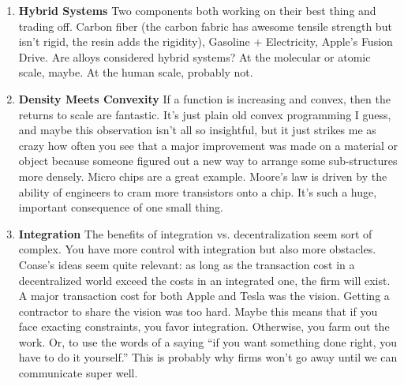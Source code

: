 \documentclass[paper=a4, fontsize=11pt]{scrartcl} %
\numberwithin{equation}{section} %
\numberwithin{figure}{section} %
\numberwithin{table}{section} %
\begin{document}
\begin{enumerate} 
\item \textbf{Hybrid Systems} Two components both working on their best thing and trading off.  Carbon fiber (the carbon fabric has awesome tensile strength but isn't rigid, the resin adds the rigidity),  Gasoline + Electricity, Apple's Fusion Drive.  Are alloys considered hybrid systems?  At the molecular or atomic scale, maybe.  At the human scale, probably not.  
\item \textbf{Density Meets Convexity} If a function is increasing and convex, then the returns to scale are fantastic.  It's just plain old convex programming I guess, and maybe this observation isn't all so insightful, but it just strikes me as crazy how often you see that a major improvement was made on a material or object because someone figured out a new way to arrange some sub-structures more densely.  Micro chips are a great example.  Moore's law is driven by the ability of engineers to cram more transistors onto a chip.  It's such a huge, important consequence of one small thing.
\item \textbf{Integration} The benefits of integration vs. decentralization seem sort of complex.  You have more control with integration but also more obstacles.  Coase's ideas seem quite relevant: as long as the transaction cost in a decentralized world exceed the costs in an integrated one, the firm will exist.  A major transaction cost for both Apple and Tesla was the vision.  Getting a contractor to share the vision was too hard.  Maybe this means that if you face exacting constraints, you favor integration.  Otherwise, you farm out the work.  Or, to use the words of a saying ``if you want something done right, you have to do it yourself.''  This is probably why firms won't go away until we can communicate super well.  
\end{enumerate}




\end{document}
